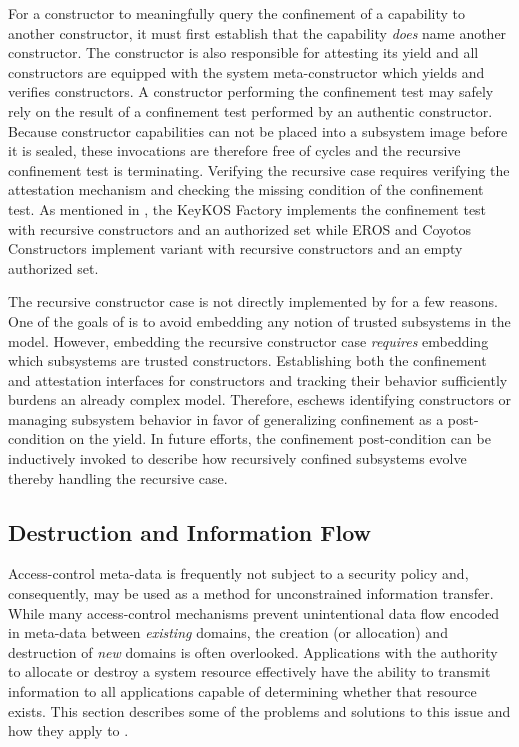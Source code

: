 For a constructor to meaningfully query the confinement of a capability to another constructor, it must first establish that the capability \emph{does} name another constructor. 
The constructor is also responsible for attesting its yield and all constructors are equipped with the system meta-constructor which yields and verifies constructors.
A constructor performing the confinement test may safely rely on the result of a confinement test performed by an authentic constructor.
Because constructor capabilities can not be placed into a subsystem image before it is sealed, these invocations are therefore free of cycles and the recursive confinement test is terminating.
Verifying the recursive case requires verifying the attestation mechanism and checking the missing condition of the confinement test.
As mentioned in , the KeyKOS Factory implements the confinement test with recursive constructors and an authorized set while EROS and Coyotos Constructors implement variant with recursive constructors and an empty authorized set.

The recursive constructor case is not directly implemented by \TMmodelName{} for a few reasons.
One of the goals of \TMmodelName{} is to avoid embedding any notion of trusted subsystems in the model.
However, embedding the recursive constructor case \emph{requires} embedding which subsystems are trusted constructors.
Establishing both the confinement and attestation interfaces for constructors and tracking their behavior sufficiently burdens an already complex model.
Therefore, \TMmodelName{} eschews identifying constructors or managing subsystem behavior in favor of generalizing confinement as a post-condition on the yield.
In future efforts, the confinement post-condition can be inductively invoked to describe how recursively confined subsystems evolve thereby handling the recursive case.

\subsection{Destruction and Information Flow}

Access-control meta-data is frequently not subject to a security policy and, consequently, may be used as a method for unconstrained information transfer.
While many access-control mechanisms prevent unintentional data flow encoded in meta-data between \emph{existing} domains, the creation (or allocation) and destruction of \emph{new} domains is often overlooked.
Applications with the authority to allocate or destroy a system resource effectively have the ability to transmit information to all applications capable of determining whether that resource exists.
This section describes some of the problems and solutions to this issue and how they apply to \TMmodelName{}.

